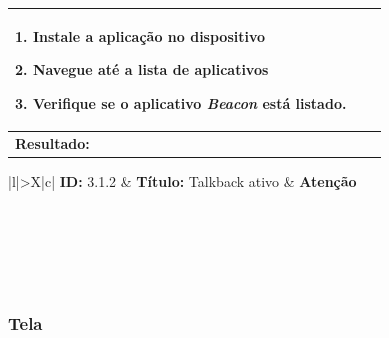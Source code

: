 \documentclass[
	12pt,				%
	oneside,			%
	a4paper,			%
	brazil				%
]{abntex2}
\begin{document}
{\begin{apendicesenv}
\begin{table}[H]
\begin{tabularx}{\textwidth}{|l|>{\hsize=2\hsize}X|c|}
{1. Instale a aplicação no dispositivo

2. Navegue até a lista de aplicativos

3. Verifique se o aplicativo \textit{Beacon} está listado.
} \\ 
\hline 
\multicolumn{3}{|X|}{\textbf{Resultado:}} \\ 
\hline 
\end{tabularx} 
\end{table}
\egroup

\bgroup
\def\arraystretch{1.5}
\begin{table}[H]

\begin{tabularx}{\textwidth}{|l|>{\hsize}X|c|}
\hline 
\textbf{ID:} 3.1.2 & \textbf{Título:} Talkback ativo & \textbf{Atenção} \\ 
\hline 
{} \\ 
\hline  
{} \\ 
\hline 
{} \\ 
\hline 
{} \\ 
\hline 
{} \\ 
\hline 
\end{tabularx} 
\end{table}
\egroup

\subsubsection*{Tela}

\bgroup
\def\arraystretch{1.5}
\begin{table}[H]


\end{table}
\end{apendicesenv}}
\end{document}
